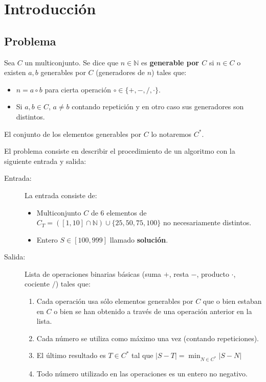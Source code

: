 \section{Introducción}
\subsection{Problema}

\begin{definition}
	Sea $C$ un multiconjunto. Se dice que $n \in \mathbb{N}$ es \textbf{generable por $C$} si $n \in C$ o
	existen $a,b$ generables por $C$ (generadores de $n$) tales que:
	\begin{itemize}
		\item $n = a \circ b$ para cierta operación $\circ \in \{+,-,/,\cdot \}$.
		\item Si $a,b \in C$, $a \neq b$ contando repetición y en otro caso sus
		generadores son distintos.
	\end{itemize}
	El conjunto de los elementos generables por $C$ lo notaremos $C^{\ast}$.
\end{definition}

El problema consiste en describir el procedimiento de un algoritmo con la
siguiente entrada y salida:

\begin{description}
	\item[Entrada:] La entrada consiste de:
		\begin{itemize}
			\item Multiconjunto $C$ de 6 elementos de $C_T = ([1,10] \cap \mathbb N) \cup \{ 25, 50, 75, 100\}$
			no necesariamente distintos.
			\item Entero $S \in [100, 999]$ llamado \textbf{solución}.
		\end{itemize}

	\item[Salida:] Lista de operaciones binarias básicas (suma $+$, resta $-$, producto $\cdot$, cociente $/$) tales que:
	\begin{enumerate}
		\item Cada operación usa sólo elementos generables por $C$ que o bien estaban en $C$ o bien se han obtenido a través de una operación anterior en la lista.
		\item Cada número se utiliza como máximo una vez (contando repeticiones).
		\item El último resultado es $T \in C^{\ast}$ tal que $|S-T| = \displaystyle \min_{N \in C^{\ast}} |S-N|$
		\item Todo número utilizado en las operaciones es un entero no negativo.
	\end{enumerate}
\end{description}

